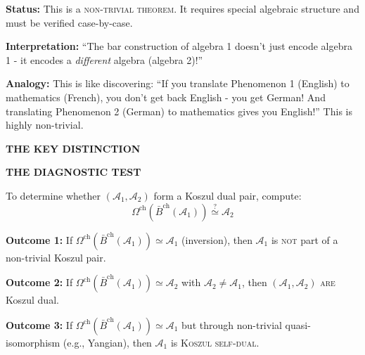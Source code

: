 \begin{remark}
\textbf{Status:} This is a \textsc{non-trivial theorem}. It requires special algebraic structure and must be verified case-by-case.

\textbf{Interpretation:} ``The bar construction of algebra 1 doesn't just encode algebra 1 - it encodes a \emph{different} algebra (algebra 2)!''

\textbf{Analogy:} This is like discovering: ``If you translate Phenomenon 1 (English) to mathematics (French), you don't get back English - you get German! And translating Phenomenon 2 (German) to mathematics gives you English!'' This is highly non-trivial.

\medskip
\noindent\textbf{THE KEY DISTINCTION}

\begin{center}
\end{center}

\medskip
\noindent\textbf{THE DIAGNOSTIC TEST}

To determine whether $(\mathcal{A}_1, \mathcal{A}_2)$ form a Koszul dual pair, compute:
$$\Omega^{\text{ch}}(\bar{B}^{\text{ch}}(\mathcal{A}_1)) \stackrel{?}{\simeq} \mathcal{A}_2$$

\textbf{Outcome 1:} If $\Omega^{\text{ch}}(\bar{B}^{\text{ch}}(\mathcal{A}_1)) \simeq \mathcal{A}_1$ (inversion), then $\mathcal{A}_1$ is \textsc{not} part of a non-trivial Koszul pair.

\textbf{Outcome 2:} If $\Omega^{\text{ch}}(\bar{B}^{\text{ch}}(\mathcal{A}_1)) \simeq \mathcal{A}_2$ with $\mathcal{A}_2 \neq \mathcal{A}_1$, then $(\mathcal{A}_1, \mathcal{A}_2)$ \textsc{are} Koszul dual.

\textbf{Outcome 3:} If $\Omega^{\text{ch}}(\bar{B}^{\text{ch}}(\mathcal{A}_1)) \simeq \mathcal{A}_1$ but through non-trivial quasi-isomorphism (e.g., Yangian), then $\mathcal{A}_1$ is \textsc{Koszul self-dual}.


\end{remark}
